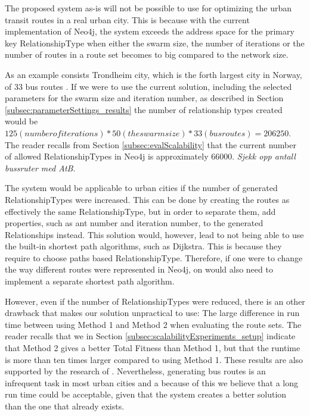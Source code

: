 The proposed system as-is will not be possible to use for optimizing the urban transit routes in a real urban city. This is because with the current implementation of Neo4j, the system exceeds the address space for the primary key RelationshipType when either the swarm size, the number of iterations or the number of routes in a route set becomes to big compared to the network size. 

As an example consists Trondheim city, which is the forth largest city in Norway, of 33 bus routes \citep{website:atb-linjenett}. If we were to use the current solution, including the selected parameters for the swarm size and iteration number, as described in Section \vref{subsec:parameterSettings_results} the number of relationship types created would be $125 (number of iterations) * 50 (the swarm size) * 33 (bus routes) = 206 250$. The reader recalls from Section \ref{subsec:evalScalability} that the current number of allowed RelationshipTypes in Neo4j is approximately $66 000$.
\emph{\color{blue} Sjekk opp antall bussruter med AtB}.

The system would be applicable to urban cities if the number of generated RelationshipTypes were increased. This can be done by creating the routes as effectively the same RelationshipType, but in order to separate them, add properties, such as ant number and iteration number, to the generated Relationships instead. This solution would, however, lead to not being able to use the built-in shortest path algorithms, such as Dijkstra. This is because they require to choose paths based RelationshipType. Therefore, if one were to change the way different routes were represented in Neo4j, on would also need to implement a separate shortest path algorithm. 

However, even if the number of RelationshipTypes were reduced, there is an other drawback that makes our solution unpractical to use: The large difference in run time between using Method 1 and Method 2 when evaluating the route sets. 
The reader recalls that we in Section \vref{subsec:scalabilityExperiments_setup} indicate that Method 2 gives a better Total Fitness than Method 1, but that the runtime is more than ten times larger compared to using Method 1. These results are also supported by the research of \citet{fan09}. Nevertheless, generating bus routes is an infrequent task in most urban cities and a because of this we believe that a long run time could be acceptable, given that the system creates a better solution than the one that already exists. 

